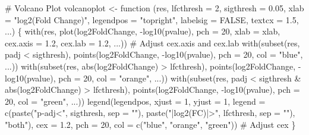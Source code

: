 \documentclass[
  letterpaper,
  DIV=11,
  numbers=noendperiod]{scrartcl}
\newenvironment{Shaded}{\begin{snugshade}}{\end{snugshade}}
\newcommand{\AttributeTok}[1]{\textcolor[rgb]{0.40,0.45,0.13}{#1}}
\newcommand{\CommentTok}[1]{\textcolor[rgb]{0.37,0.37,0.37}{#1}}
\newcommand{\ConstantTok}[1]{\textcolor[rgb]{0.56,0.35,0.01}{#1}}
\newcommand{\ControlFlowTok}[1]{\textcolor[rgb]{0.00,0.23,0.31}{#1}}
\newcommand{\DecValTok}[1]{\textcolor[rgb]{0.68,0.00,0.00}{#1}}
\newcommand{\FloatTok}[1]{\textcolor[rgb]{0.68,0.00,0.00}{#1}}
\newcommand{\FunctionTok}[1]{\textcolor[rgb]{0.28,0.35,0.67}{#1}}
\newcommand{\NormalTok}[1]{\textcolor[rgb]{0.00,0.23,0.31}{#1}}
\newcommand{\OtherTok}[1]{\textcolor[rgb]{0.00,0.23,0.31}{#1}}
\newcommand{\SpecialCharTok}[1]{\textcolor[rgb]{0.37,0.37,0.37}{#1}}
\newcommand{\StringTok}[1]{\textcolor[rgb]{0.13,0.47,0.30}{#1}}
\begin{document}
\begin{Shaded}
\begin{Highlighting}[]
\CommentTok{\# Volcano Plot}
\NormalTok{volcanoplot }\OtherTok{\textless{}{-}} \ControlFlowTok{function}\NormalTok{ (res, }\AttributeTok{lfcthresh =} \DecValTok{2}\NormalTok{, }\AttributeTok{sigthresh =} \FloatTok{0.05}\NormalTok{, }\AttributeTok{xlab =} \StringTok{"log2(Fold Change)"}\NormalTok{, }\AttributeTok{legendpos =} \StringTok{"topright"}\NormalTok{, }\AttributeTok{labelsig =} \ConstantTok{FALSE}\NormalTok{, }\AttributeTok{textcx =} \FloatTok{1.5}\NormalTok{, ...) \{}
  \FunctionTok{with}\NormalTok{(res, }\FunctionTok{plot}\NormalTok{(log2FoldChange, }\SpecialCharTok{{-}}\FunctionTok{log10}\NormalTok{(pvalue), }\AttributeTok{pch =} \DecValTok{20}\NormalTok{, }\AttributeTok{xlab =}\NormalTok{ xlab, }\AttributeTok{cex.axis =} \FloatTok{1.2}\NormalTok{, }\AttributeTok{cex.lab =} \FloatTok{1.2}\NormalTok{, ...))  }\CommentTok{\# Adjust cex.axis and cex.lab}
  \FunctionTok{with}\NormalTok{(}\FunctionTok{subset}\NormalTok{(res, padj }\SpecialCharTok{\textless{}}\NormalTok{ sigthresh), }\FunctionTok{points}\NormalTok{(log2FoldChange, }\SpecialCharTok{{-}}\FunctionTok{log10}\NormalTok{(pvalue), }\AttributeTok{pch =} \DecValTok{20}\NormalTok{, }\AttributeTok{col =} \StringTok{"blue"}\NormalTok{, ...))}
  \FunctionTok{with}\NormalTok{(}\FunctionTok{subset}\NormalTok{(res, }\FunctionTok{abs}\NormalTok{(log2FoldChange) }\SpecialCharTok{\textgreater{}}\NormalTok{ lfcthresh), }\FunctionTok{points}\NormalTok{(log2FoldChange, }\SpecialCharTok{{-}}\FunctionTok{log10}\NormalTok{(pvalue), }\AttributeTok{pch =} \DecValTok{20}\NormalTok{, }\AttributeTok{col =} \StringTok{"orange"}\NormalTok{, ...))}
  \FunctionTok{with}\NormalTok{(}\FunctionTok{subset}\NormalTok{(res, padj }\SpecialCharTok{\textless{}}\NormalTok{ sigthresh }\SpecialCharTok{\&} \FunctionTok{abs}\NormalTok{(log2FoldChange) }\SpecialCharTok{\textgreater{}}\NormalTok{ lfcthresh), }\FunctionTok{points}\NormalTok{(log2FoldChange, }\SpecialCharTok{{-}}\FunctionTok{log10}\NormalTok{(pvalue), }\AttributeTok{pch =} \DecValTok{20}\NormalTok{, }\AttributeTok{col =} \StringTok{"green"}\NormalTok{, ...))}
  \FunctionTok{legend}\NormalTok{(legendpos, }\AttributeTok{xjust =} \DecValTok{1}\NormalTok{, }\AttributeTok{yjust =} \DecValTok{1}\NormalTok{, }\AttributeTok{legend =} \FunctionTok{c}\NormalTok{(}\FunctionTok{paste}\NormalTok{(}\StringTok{"p{-}adj\textless{}"}\NormalTok{, sigthresh, }\AttributeTok{sep =} \StringTok{""}\NormalTok{), }\FunctionTok{paste}\NormalTok{(}\StringTok{"|log2(FC)|\textgreater{}"}\NormalTok{, lfcthresh, }\AttributeTok{sep =} \StringTok{""}\NormalTok{), }\StringTok{"both"}\NormalTok{), }\AttributeTok{cex =} \FloatTok{1.2}\NormalTok{, }\AttributeTok{pch =} \DecValTok{20}\NormalTok{, }\AttributeTok{col =} \FunctionTok{c}\NormalTok{(}\StringTok{"blue"}\NormalTok{, }\StringTok{"orange"}\NormalTok{, }\StringTok{"green"}\NormalTok{))  }\CommentTok{\# Adjust cex}
\NormalTok{\}}


\end{Highlighting}
\end{Shaded}
\end{document}
